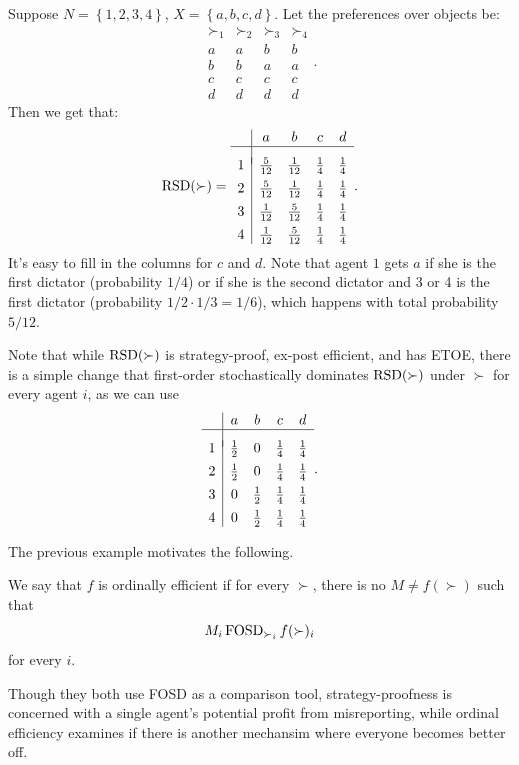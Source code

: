 \begin{example} \label{5-18-1}
	Suppose $N = \left\{1,2,3,4\right\}$, $X = \left\{a,b,c,d\right\}$. Let the preferences over objects be:
	\[
		\begin{array}{cccc}
			\succ_1 & \succ_2 & \succ_3 & \succ_4 \\
			\hline
			a & a & b & b \\
			b & b & a & a \\
			c & c & c & c \\
			d & d & d & d
		\end{array}
	.\]
	Then we get that:
	\[
		\operatorname{RSD}(\succ) =
		\begin{array}{c|cccc}
			& a & b & c & d \\
			\hline \\[-0.45em]
			1 & \frac{5}{12} & \frac{1}{12} & \frac{1}{4} & \frac{1}{4} \\[0.45em]
			2 & \frac{5}{12} & \frac{1}{12} & \frac{1}{4} & \frac{1}{4} \\[0.45em]
			3 & \frac{1}{12} & \frac{5}{12} & \frac{1}{4} & \frac{1}{4} \\[0.45em]
			4 & \frac{1}{12} & \frac{5}{12} & \frac{1}{4} & \frac{1}{4}
		\end{array}
	.\]
	It's easy to fill in the columns for $c$ and $d$. Note that agent $1$ gets $a$ if she is the first dictator (probability $1/4$) or if she is the second dictator and 3 or 4 is the first dictator (probability $1 /2 \cdot 1/3 = 1/6$), which happens with total probability $5 /12$.

	Note that while $\operatorname{RSD}(\succ)$ is strategy-proof, ex-post efficient, and has ETOE, there is a simple change that first-order stochastically dominates $\operatorname{RSD}(\succ)$ under $\succ$ for every agent $i$, as we can use  \[
		\begin{array}{c|cccc}
			& a & b & c & d \\
			\hline \\[-0.45em]
			1 & \frac{1}{2} & 0 & \frac{1}{4} & \frac{1}{4} \\[0.45em]
			2 & \frac{1}{2} & 0 & \frac{1}{4} & \frac{1}{4} \\[0.45em]
			3 & 0 & \frac{1}{2} & \frac{1}{4} & \frac{1}{4} \\[0.45em]
			4 & 0 & \frac{1}{2} & \frac{1}{4} & \frac{1}{4}
		\end{array}
	.\]
\end{example}

The previous example motivates the following.
\begin{definition}
	We say that $f$ is ordinally efficient if for every $\succ$, there is no $M \ne f(\succ)$ such that \[
		M_i \operatorname{FOSD}_{\succ_i} f(\succ)_i
	\] for every $i$.
\end{definition}
Though they both use FOSD as a comparison tool, strategy-proofness is concerned with a single agent's potential profit from misreporting, while ordinal efficiency examines if there is another mechansim where everyone becomes better off.

